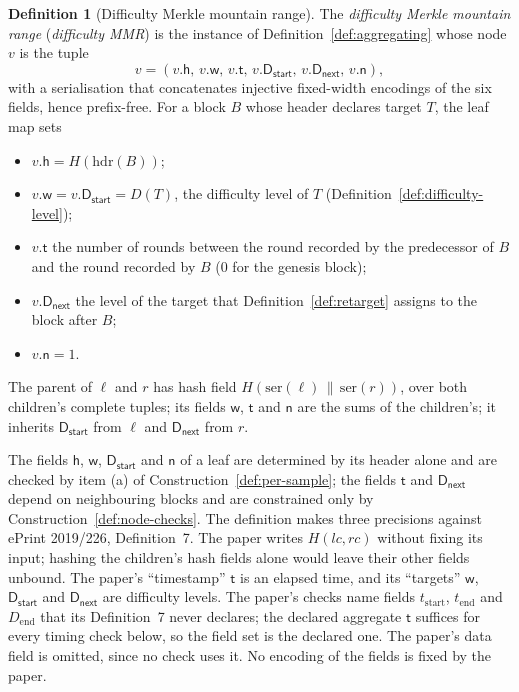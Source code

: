 \documentclass[11pt,a4paper]{article}
\theoremstyle{definition}
\newtheorem{definition}[theorem]{Definition}
\begin{document}
\begin{definition}[Difficulty Merkle mountain range]\label{def:diff-mmr}
The \emph{difficulty Merkle mountain range} (\emph{difficulty MMR}) is the
instance of Definition~\ref{def:aggregating} whose node $v$ is the tuple
\[
  v=(v.\mathsf{h},\,v.\mathsf{w},\,v.\mathsf{t},\,v.\mathsf{D}_{\mathsf{start}},
  \,v.\mathsf{D}_{\mathsf{next}},\,v.\mathsf{n}),
\]
with a serialisation that concatenates injective fixed-width encodings of
the six fields, hence prefix-free. For a block $B$ whose header declares
target $T$, the leaf map sets
\begin{itemize}
\item $v.\mathsf{h}=H(\mathrm{hdr}(B))$;
\item $v.\mathsf{w}=v.\mathsf{D}_{\mathsf{start}}=D(T)$, the difficulty
  level of $T$ (Definition~\ref{def:difficulty-level});
\item $v.\mathsf{t}$ the number of rounds between the round recorded by the
  predecessor of $B$ and the round recorded by $B$ ($0$ for the genesis
  block);
\item $v.\mathsf{D}_{\mathsf{next}}$ the level of the target that
  Definition~\ref{def:retarget} assigns to the block after $B$;
\item $v.\mathsf{n}=1$.
\end{itemize}
The parent of $\ell$ and $r$ has hash field
$H(\mathrm{ser}(\ell)\,\|\,\mathrm{ser}(r))$, over both children's complete
tuples; its fields $\mathsf{w}$, $\mathsf{t}$ and $\mathsf{n}$ are the sums
of the children's; it inherits $\mathsf{D}_{\mathsf{start}}$ from $\ell$ and
$\mathsf{D}_{\mathsf{next}}$ from $r$.
\end{definition}

The fields $\mathsf{h}$, $\mathsf{w}$, $\mathsf{D}_{\mathsf{start}}$ and
$\mathsf{n}$ of a leaf are determined by its header alone and are checked by
item (a) of Construction~\ref{def:per-sample}; the fields $\mathsf{t}$ and
$\mathsf{D}_{\mathsf{next}}$ depend on neighbouring blocks and are
constrained only by Construction~\ref{def:node-checks}. The definition makes
three precisions against ePrint 2019/226, Definition~7. The paper writes
$H(lc, rc)$ without fixing its input; hashing the children's hash fields
alone would leave their other fields unbound. The paper's ``timestamp''
$\mathsf{t}$ is an elapsed time, and its ``targets'' $\mathsf{w}$,
$\mathsf{D}_{\mathsf{start}}$ and $\mathsf{D}_{\mathsf{next}}$ are
difficulty levels. The paper's checks name fields $t_{\mathrm{start}}$,
$t_{\mathrm{end}}$ and $D_{\mathrm{end}}$ that its Definition~7 never
declares; the declared aggregate $\mathsf{t}$ suffices for every timing
check below, so the field set is the declared one. The paper's data field is
omitted, since no check uses it. No encoding of the fields is fixed by the
paper.
\end{document}
